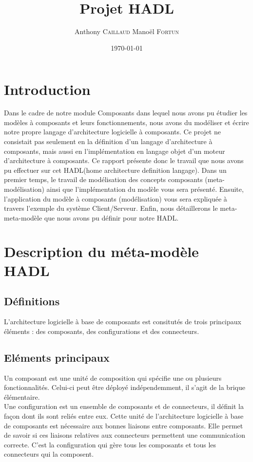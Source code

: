 \documentclass[11pt,a4paper]{article}
\title{Projet HADL}
\author{Anthony \textsc{Caillaud} Manoël \textsc{Fortun}}
\date{\today}
\begin{document}
\maketitle


\clearpage
\tableofcontents
\clearpage
\section{Introduction}

Dans le cadre de notre module Composants dans lequel nous avons pu étudier les
modèles à composants et leurs fonctionnements, nous avons du modéliser et écrire
notre propre langage d'architecture logicielle à composants. Ce projet ne
consistait pas seulement en la définition d'un langage d'architecture à
composants, mais aussi en l'implémentation en langage objet d'un moteur
d'architecture à composants. Ce rapport présente donc le travail que nous avons
pu effectuer sur cet HADL(home architecture definition langage). Dans un
premier temps, le travail de modélisation des concepts composants
(meta-modélisation) ainsi que l'implémentation du modèle vous sera présenté.
Ensuite, l'application du modèle à composants (modélisation) vous sera
expliquée à travers l'exemple du système Client/Serveur. Enfin, nous
détaillerons le meta-meta-modèle que nous avons pu définir pour notre HADL.


 
\section{Description du méta-modèle HADL}
\subsection{Définitions}
L'architecture logicielle à base de composants est consitutés de trois
principaux éléments : des composants, des configurations et des connecteurs.\\

\subsection{Eléments principaux}

 Un composant est une unité de composition qui spécifie une ou plusieurs
 fonctionnalités. Celui-ci peut être déployé indépendemment, il s'agit de la
 brique élémentaire.\\

Une configuration est un ensemble de composants et de connecteurs, il définit la
façon dont ils sont reliés entre eux. Cette unité de l'architecture logicielle
à base de composants est nécessaire aux bonnes liaisons entre composants. Elle
permet de savoir si ces liaisons relatives aux connecteurs permettent une
communication correcte. C'est la configuration qui gère tous les composants et
tous les connecteurs qui la composent.\\
\end{document}
